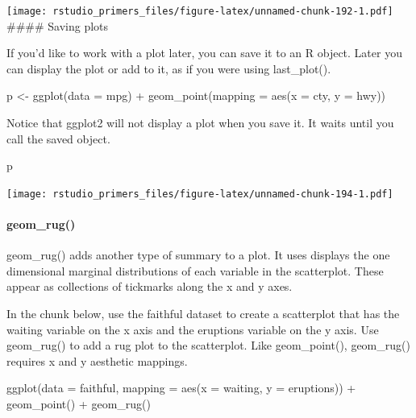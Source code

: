 \documentclass[
]{article}
\newenvironment{Shaded}{\begin{snugshade}}{\end{snugshade}}
\newcommand{\AttributeTok}[1]{\textcolor[rgb]{0.77,0.63,0.00}{#1}}
\newcommand{\FunctionTok}[1]{\textcolor[rgb]{0.00,0.00,0.00}{#1}}
\newcommand{\NormalTok}[1]{#1}
\newcommand{\OtherTok}[1]{\textcolor[rgb]{0.56,0.35,0.01}{#1}}
\newcommand{\SpecialCharTok}[1]{\textcolor[rgb]{0.00,0.00,0.00}{#1}}
\begin{document}
\texttt{[image: rstudio\_primers\_files/figure-latex/unnamed-chunk-192-1.pdf]}
\#\#\#\# Saving plots

If you'd like to work with a plot later, you can save it to an R object.
Later you can display the plot or add to it, as if you were using
last\_plot().

\begin{Shaded}
\begin{Highlighting}[]
\NormalTok{p }\OtherTok{\textless{}{-}} \FunctionTok{ggplot}\NormalTok{(}\AttributeTok{data =}\NormalTok{ mpg) }\SpecialCharTok{+}
  \FunctionTok{geom\_point}\NormalTok{(}\AttributeTok{mapping =} \FunctionTok{aes}\NormalTok{(}\AttributeTok{x =}\NormalTok{ cty, }\AttributeTok{y =}\NormalTok{ hwy))}
\end{Highlighting}
\end{Shaded}

Notice that ggplot2 will not display a plot when you save it. It waits
until you call the saved object.

\begin{Shaded}
\begin{Highlighting}[]
\NormalTok{p}
\end{Highlighting}
\end{Shaded}

\texttt{[image: rstudio\_primers\_files/figure-latex/unnamed-chunk-194-1.pdf]}

\hypertarget{geom_rug}{%
\paragraph{geom\_rug()}\label{geom_rug}}

geom\_rug() adds another type of summary to a plot. It uses displays the
one dimensional marginal distributions of each variable in the
scatterplot. These appear as collections of tickmarks along the x and y
axes.

In the chunk below, use the faithful dataset to create a scatterplot
that has the waiting variable on the x axis and the eruptions variable
on the y axis. Use geom\_rug() to add a rug plot to the scatterplot.
Like geom\_point(), geom\_rug() requires x and y aesthetic mappings.

\begin{Shaded}
\begin{Highlighting}[]
\FunctionTok{ggplot}\NormalTok{(}\AttributeTok{data =}\NormalTok{ faithful, }\AttributeTok{mapping =} \FunctionTok{aes}\NormalTok{(}\AttributeTok{x =}\NormalTok{ waiting, }\AttributeTok{y =}\NormalTok{ eruptions)) }\SpecialCharTok{+} 
  \FunctionTok{geom\_point}\NormalTok{() }\SpecialCharTok{+} 
  \FunctionTok{geom\_rug}\NormalTok{()}
\end{Highlighting}
\end{Shaded}
\end{document}
